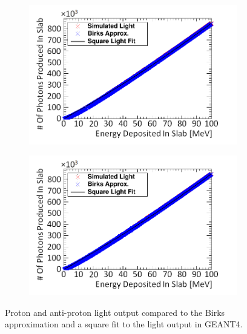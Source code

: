 \begin{figure}[!h]
\centering
\begin{subfigure}{.5\textwidth}
  \centering
  \includegraphics[width=\linewidth]{Chapter4/Figs/Raster/protonSimulatedLightNew.png}
  \captionsetup{width=.9\linewidth}
  \caption{}
  \label{subFig:proton_light}
\end{subfigure}%
\begin{subfigure}{.5\textwidth}
  \centering
  \includegraphics[width=\linewidth]{Chapter4/Figs/Raster/aProtonSimulatedLightNew.png}
  \captionsetup{width=.9\linewidth}
  \caption{}
  \label{subFig:aproton_light}
\end{subfigure}
\caption{Proton and anti-proton light output compared to the Birks approximation and a square fit to the light output in GEANT4.}
\label{fig:proton_aproton_light}
\end{figure}

